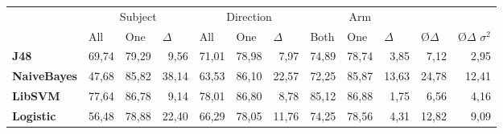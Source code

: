 \documentclass[journal]{IEEEtran}
\begin{document}
\begin{table}
\centering
\begin{tabular}{lrrrrrrrrrrr}
                      & \multicolumn{3}{c}{Subject}                                                      & \multicolumn{3}{c}{Direction}                                                    & \multicolumn{3}{c}{Arm}                                                           & \multicolumn{1}{l}{}            & \multicolumn{1}{l}{}                       \\
\textbf{}             & \multicolumn{1}{l}{All} & \multicolumn{1}{l}{One} & \multicolumn{1}{l}{$\Delta$} & \multicolumn{1}{l}{All} & \multicolumn{1}{l}{One} & \multicolumn{1}{l}{$\Delta$} & \multicolumn{1}{l}{Both} & \multicolumn{1}{l}{One} & \multicolumn{1}{l}{$\Delta$} & \multicolumn{1}{l}{\O $\Delta$} & \multicolumn{1}{l}{\O $\Delta$ $\sigma^2$} \\ \hline
\textbf{J48}        & 69,74                                     & 79,29                                    & 9,56                               & 71,01                                       & 78,98                                      & 7,97                               & 74,89                                  & 78,74                                & 3,85                               & 7,12                                    & 2,95                                           \\
\textbf{NaiveBayes} & 47,68                                     & 85,82                                    & 38,14                              & 63,53                                       & 86,10                                      & 22,57                              & 72,25                                  & 85,87                                & 13,63                              & 24,78                                   & 12,41                                          \\
\textbf{LibSVM}     & 77,64                                     & 86,78                                    & 9,14                               & 78,01                                       & 86,80                                      & 8,78                               & 85,12                                  & 86,88                                & 1,75                               & 6,56                                    & 4,16                                           \\
\textbf{Logistic}   & 56,48                                     & 78,88                                    & 22,40                              & 66,29                                       & 78,05                                      & 11,76                              & 74,25                                  & 78,56                                & 4,31                               & 12,82                                   & 9,09                                           \\ \hline

\end{tabular}
\end{table}
\end{document}
